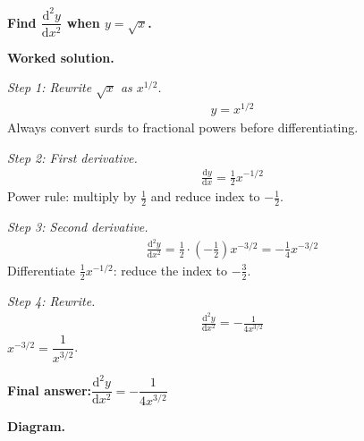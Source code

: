 \documentclass[11pt]{article}
\newcommand{\question}[1]{\par\medskip\noindent\textbf{#1}\par}
\begin{document}
\question{Find \( \dfrac{\mathrm{d}^2y}{\mathrm{d}x^2} \) when \( y = \sqrt{x} \).}

\textbf{Worked solution.}

\textit{Step 1: Rewrite \( \sqrt{x} \) as \( x^{1/2} \).}
\[\begin{gathered}
y = x^{1/2}
\end{gathered}\]
Always convert surds to fractional powers before differentiating.

\textit{Step 2: First derivative.}
\[\begin{gathered}
\frac{\mathrm{d}y}{\mathrm{d}x} = \tfrac{1}{2}x^{-1/2}
\end{gathered}\]
Power rule: multiply by \( \tfrac{1}{2} \) and reduce index to \( -\tfrac{1}{2} \).

\textit{Step 3: Second derivative.}
\[\begin{gathered}
\frac{\mathrm{d}^2y}{\mathrm{d}x^2} = \tfrac{1}{2} \cdot \left(-\tfrac{1}{2}\right) x^{-3/2} = -\tfrac{1}{4}x^{-3/2}
\end{gathered}\]
Differentiate \( \tfrac{1}{2}x^{-1/2} \): reduce the index to \( -\tfrac{3}{2} \).

\textit{Step 4: Rewrite.}
\[\begin{gathered}
\frac{\mathrm{d}^2y}{\mathrm{d}x^2} = -\frac{1}{4x^{3/2}}
\end{gathered}\]
\( x^{-3/2} = \dfrac{1}{x^{3/2}} \).

\begin{answerbox}
\textbf{Final answer:}\quad \(\displaystyle  \dfrac{\mathrm{d}^2y}{\mathrm{d}x^2} = -\dfrac{1}{4x^{3/2}} \)
\end{answerbox}
\textbf{Diagram.}
\end{document}
